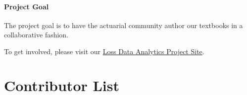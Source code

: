 \documentclass[]{book}
\theoremstyle{definition}
\theoremstyle{definition}
\theoremstyle{definition}
\theoremstyle{remark}
\begin{document}
\subsubsection*{Project Goal}\label{project-goal}

The project goal is to have the actuarial community author our textbooks
in a collaborative fashion.

To get involved, please visit our
\href{https://sites.google.com/a/wisc.edu/loss-data-analytics/}{Loss
Data Analytics Project Site}.

\chapter*{Contributor List}\label{contributor-list}
\end{document}
